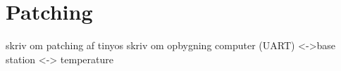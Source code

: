 \section{Patching}
skriv om patching af tinyos
	skriv om opbygning computer (UART) <->base station <-> temperature
